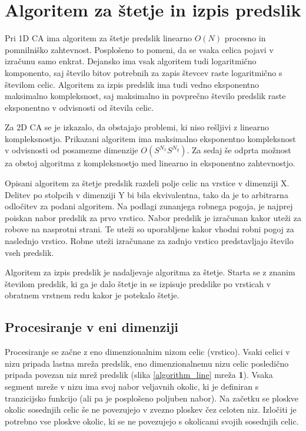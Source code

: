 \documentclass[12pt,a4paper,openany,twoside]{book}
\begin{document}
\chapter{Algoritem za štetje in izpis predslik}

Pri 1D CA ima algoritem za štetje predslik linearno \(O(N)\) procesno in pomnilniško zahtevnost.
Posplošeno to pomeni, da se vsaka celica pojavi v izračunu samo enkrat.
Dejansko ima vsak algoritem tudi logaritmično komponento,
saj število bitov potrebnih za zapis števcev raste logaritmično s številom celic.
Algoritem za izpis predslik ima tudi vedno eksponentno maksimalno kompleksnost,
saj maksimalno in povprečno število predslik raste eksponentno
v odvisnosti od števila celic.

Za 2D CA se je izkazalo, da obstajajo problemi, ki niso rešljivi z linearno kompleksnostjo.
Prikazani algoritem ima maksimalno eksponentno kompleksnost
v odvisnosti od posamezne dimenzije \(O(S^{N_x} S^{N_y})\).
Za sedaj še odprta možnost za obstoj algoritma z kompleksnostjo
med linearno in eksponentno zahtevnostjo.

Opisani algoritem za štetje predslik razdeli polje celic na vrstice v dimenziji X.
Delitev po stolpcih v dimenziji Y bi bila ekvivalentna,
tako da je to arbitrarna odločitev za podani algoritem.
Na podlagi zunanjega robnega pogoja, je najprej poiskan nabor predslik za prvo vrstico.
Nabor predslik je izračunan kakor uteži za robove na nasprotni strani.
Te uteži so uporabljene kakor vhodni robni pogoj za naslednjo vrstico.
Robne uteži izračunane za zadnjo vrstico predstavljajo število vseh predslik.

Algoritem za izpis predslik je nadaljevaje algoritma za štetje.
Starta se z znanim številom predslik, ki ga je dalo štetje in se
izpisuje predslike po vrsticah v obratnem vrstnem redu kakor je potekalo štetje.

\section{Procesiranje v eni dimenziji}

Procesiranje se začne z eno dimenzionalnim nizom celic (vrstico).
Vsaki celici v nizu pripada lastna mreža predslik, eno dimenzionalnemu nizu celic
posledično pripada povezan niz mrež predslik (slika \ref{algorithm_line} mreža \textbf{1}).
Vsaka segment mreže v nizu ima svoj nabor veljavnih okolic,
ki je definiran s tranzicijsko funkcijo (ali pa je posplošeno poljuben nabor).
Na začetku se ploskve okolic sosednjih celic še ne povezujejo v
zvezno ploskev čez celoten niz. Izločiti je potrebno vse ploskve okolic,
ki se ne povezujejo s okolicami svojih sosednjih celic.
\end{document}
